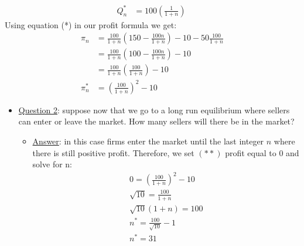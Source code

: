 \documentclass{article}
\begin{document}
\begin{itemize}
\begin{itemize}
\begin{align*}
        Q_{n}^{*} &= 100 (\frac{1}{1+n}) \ \tag{*}
      \end{align*}
      Using equation (*) in our profit formula we get:
      \begin{align*}
        \pi_{n} &= \frac{100}{1+n} (150 - \frac{100n}{1+n}) - 10 - 50 \frac{100}{1 + n} \\
        &= \frac{100}{1+n}(100 - \frac{100n}{1+n}) - 10 \\
        &= \frac{100}{1+n}(\frac{100}{1+n}) - 10 \\
        \pi_{n}^{*} &= (\frac{100}{1+n})^{2} - 10 \ \tag{**}
      \end{align*}
    \end{itemize}
  \end{itemize}
  \begin{itemize}
    \item  \underline{Question 2}: suppose now that we go to a long run equilibrium where sellers can enter or leave the market. How many sellers will there be in the market?
    \begin{itemize}
      \item  \underline{Answer}: in this case firms enter the market until the last integer $n$ where there is still positive profit. Therefore, we set $(**)$ profit equal to 0 and solve for n:
      \begin{align*}
        0 = (\frac{100}{1 + n})^{2} - 10 \\
        \sqrt{10} = \frac{100}{1 + n} \\
        \sqrt{10}(1+n) = 100 \\
        n^{*} = \frac{100}{\sqrt{10}} - 1 \\
        n^{*} = 31
      \end{align*}
    \end{itemize}
  \end{itemize}
\end{document}
